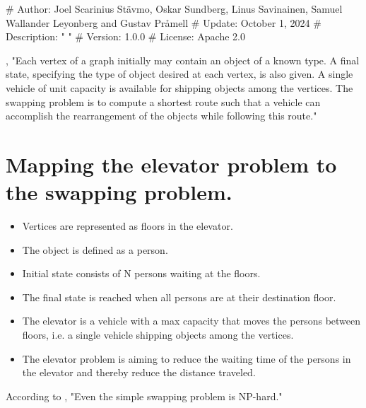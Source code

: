 # Author: Joel Scarinius Stävmo, Oskar Sundberg, Linus Savinainen, Samuel Wallander Leyonberg  and Gustav Pråmell
# Update: October 1, 2024
# Description: " "
# Version: 1.0.0
# License: Apache 2.0


\cite{anily1992swapping}, "Each vertex of a graph initially may contain an object of a known type. A final state, specifying the type of object desired at each vertex, is also given. A single vehicle of unit capacity is available for shipping objects among the vertices. The swapping problem is to compute a shortest route such that a vehicle can accomplish the rearrangement of the objects while following this route."
\section*{Mapping the elevator problem to the swapping problem.}
\begin{itemize}
	\item Vertices are represented as floors in the elevator.
	\item The object is defined as a person.
	\item Initial state consists of N persons waiting at the floors.
	\item The final state is reached when all persons are at their destination floor.
	\item The elevator is a vehicle with a max capacity that moves the persons between floors, i.e. a single vehicle shipping objects among the vertices.
	\item The elevator problem is aiming to reduce the waiting time of the persons in the elevator and thereby reduce the distance traveled.
\end{itemize}

According to \cite{anily1992swapping},  "Even the simple swapping problem is NP-hard."
